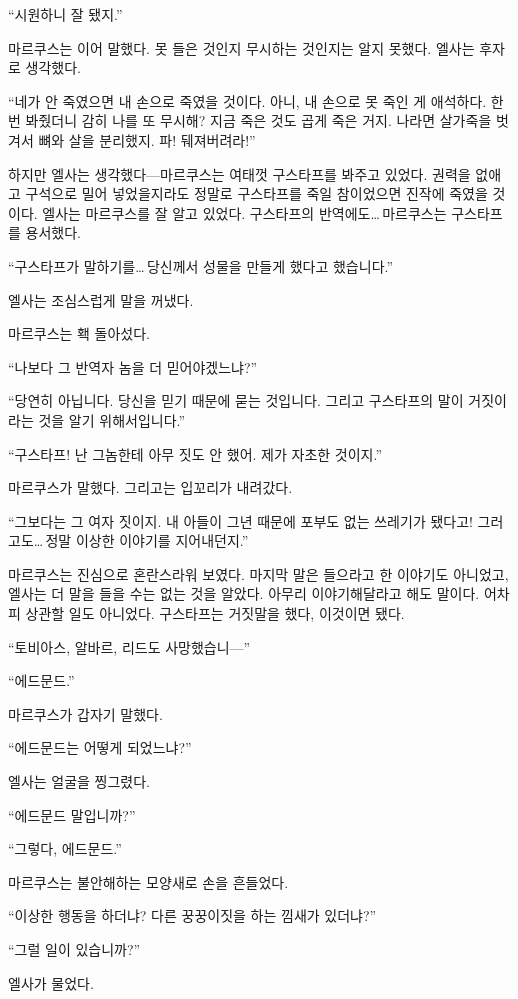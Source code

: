 ``시원하니 잘 됐지.''

마르쿠스는 이어 말했다. 못 들은 것인지 무시하는 것인지는 알지 못했다. 엘사는 후자로 생각했다.

``네가 안 죽였으면 내 손으로 죽였을 것이다. 아니, 내 손으로 못 죽인 게 애석하다. 한 번 봐줬더니 감히 나를 또 무시해? 지금 죽은 것도 곱게 죽은 거지. 나라면 살가죽을 벗겨서 뼈와 살을 분리했지. 파! 뒈져버려라!''

하지만 엘사는 생각했다—마르쿠스는 여태껏 구스타프를 봐주고 있었다. 권력을 없애고 구석으로 밀어 넣었을지라도 정말로 구스타프를 죽일 참이었으면 진작에 죽였을 것이다. 엘사는 마르쿠스를 잘 알고 있었다. 구스타프의 반역에도\ldots\,마르쿠스는 구스타프를 용서했다.

``구스타프가 말하기를\ldots\,당신께서 성물을 만들게 했다고 했습니다.''

엘사는 조심스럽게 말을 꺼냈다.

마르쿠스는 홱 돌아섰다.

``나보다 그 반역자 놈을 더 믿어야겠느냐?''

``당연히 아닙니다. 당신을 믿기 때문에 묻는 것입니다. 그리고 구스타프의 말이 거짓이라는 것을 알기 위해서입니다.''

``구스타프! 난 그놈한테 아무 짓도 안 했어. 제가 자초한 것이지.''

마르쿠스가 말했다. 그리고는 입꼬리가 내려갔다.

``그보다는 그 여자 짓이지. 내 아들이 그년 때문에 포부도 없는 쓰레기가 됐다고! 그러고도\ldots\,정말 이상한 이야기를 지어내던지.''

마르쿠스는 진심으로 혼란스라워 보였다. 마지막 말은 들으라고 한 이야기도 아니었고, 엘사는 더 말을 들을 수는 없는 것을 알았다. 아무리 이야기해달라고 해도 말이다. 어차피 상관할 일도 아니었다. 구스타프는 거짓말을 했다, 이것이면 됐다.

``토비아스, 알바르, 리드도 사망했습니—''

``에드문드.''

마르쿠스가 갑자기 말했다.

``에드문드는 어떻게 되었느냐?''

엘사는 얼굴을 찡그렸다.

``에드문드 말입니까?''

``그렇다, 에드문드.''

마르쿠스는 불안해하는 모양새로 손을 흔들었다.

``이상한 행동을 하더냐? 다른 꿍꿍이짓을 하는 낌새가 있더냐?''

``그럴 일이 있습니까?''

엘사가 물었다.


